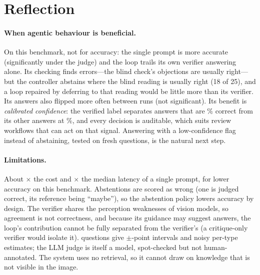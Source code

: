 \documentclass{article}
\begin{document}
\section{Reflection}
\paragraph{When agentic behaviour is beneficial.} On this benchmark, not for accuracy: the single prompt is more
accurate (significantly under the judge) and the loop trails its own verifier answering alone. Its checking finds
errors---the blind check's objections are usually right---but the controller abstains where the blind reading is
usually right (18 of 25), and a loop repaired by deferring to that reading would be little more than its verifier.
Its answers also flipped more often between runs (not significant). Its benefit is \emph{calibrated confidence}: the verified label separates answers that are
\SigVerAcc\% correct from its other answers at \UnverAcc\%, and every decision is auditable, which suits review workflows that
can act on that signal. Answering with a low-confidence flag instead of abstaining, tested on fresh questions, is the
natural next step.

\paragraph{Limitations.} About \CostRatio$\times$ the cost and \LatRatio$\times$ the median latency of a single prompt,
for lower accuracy on this benchmark. Abstentions are scored as wrong (one is judged correct, its reference being ``maybe''), so the
abstention policy lowers accuracy by design.
The verifier shares the perception weaknesses of vision models, so agreement is not correctness, and because its
guidance may suggest answers, the loop's contribution cannot be fully separated from the verifier's (a critique-only
verifier would isolate it). \NCases{} questions
give $\pm$\CIHalf-point intervals and noisy per-type estimates; the LLM judge is itself a model, spot-checked but not
human-annotated. The system uses no retrieval, so it cannot draw on knowledge that is not visible in the image.
\end{document}
